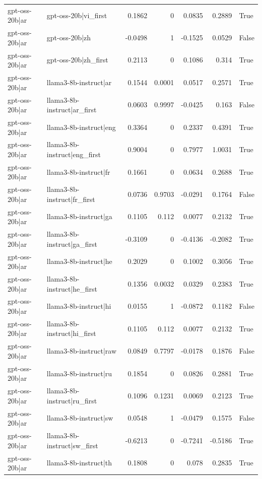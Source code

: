 \begin{table}
\begin{tabular}{l l r r r r l}
gpt-oss-20b|ar & gpt-oss-20b|vi_first & 0.1862 & 0 & 0.0835 & 0.2889 & True \\
gpt-oss-20b|ar & gpt-oss-20b|zh & -0.0498 & 1 & -0.1525 & 0.0529 & False \\
gpt-oss-20b|ar & gpt-oss-20b|zh_first & 0.2113 & 0 & 0.1086 & 0.314 & True \\
gpt-oss-20b|ar & llama3-8b-instruct|ar & 0.1544 & 0.0001 & 0.0517 & 0.2571 & True \\
gpt-oss-20b|ar & llama3-8b-instruct|ar_first & 0.0603 & 0.9997 & -0.0425 & 0.163 & False \\
gpt-oss-20b|ar & llama3-8b-instruct|eng & 0.3364 & 0 & 0.2337 & 0.4391 & True \\
gpt-oss-20b|ar & llama3-8b-instruct|eng_first & 0.9004 & 0 & 0.7977 & 1.0031 & True \\
gpt-oss-20b|ar & llama3-8b-instruct|fr & 0.1661 & 0 & 0.0634 & 0.2688 & True \\
gpt-oss-20b|ar & llama3-8b-instruct|fr_first & 0.0736 & 0.9703 & -0.0291 & 0.1764 & False \\
gpt-oss-20b|ar & llama3-8b-instruct|ga & 0.1105 & 0.112 & 0.0077 & 0.2132 & True \\
gpt-oss-20b|ar & llama3-8b-instruct|ga_first & -0.3109 & 0 & -0.4136 & -0.2082 & True \\
gpt-oss-20b|ar & llama3-8b-instruct|he & 0.2029 & 0 & 0.1002 & 0.3056 & True \\
gpt-oss-20b|ar & llama3-8b-instruct|he_first & 0.1356 & 0.0032 & 0.0329 & 0.2383 & True \\
gpt-oss-20b|ar & llama3-8b-instruct|hi & 0.0155 & 1 & -0.0872 & 0.1182 & False \\
gpt-oss-20b|ar & llama3-8b-instruct|hi_first & 0.1105 & 0.112 & 0.0077 & 0.2132 & True \\
gpt-oss-20b|ar & llama3-8b-instruct|raw & 0.0849 & 0.7797 & -0.0178 & 0.1876 & False \\
gpt-oss-20b|ar & llama3-8b-instruct|ru & 0.1854 & 0 & 0.0826 & 0.2881 & True \\
gpt-oss-20b|ar & llama3-8b-instruct|ru_first & 0.1096 & 0.1231 & 0.0069 & 0.2123 & True \\
gpt-oss-20b|ar & llama3-8b-instruct|sw & 0.0548 & 1 & -0.0479 & 0.1575 & False \\
gpt-oss-20b|ar & llama3-8b-instruct|sw_first & -0.6213 & 0 & -0.7241 & -0.5186 & True \\
gpt-oss-20b|ar & llama3-8b-instruct|th & 0.1808 & 0 & 0.078 & 0.2835 & True \\

\end{tabular}
\end{table}
